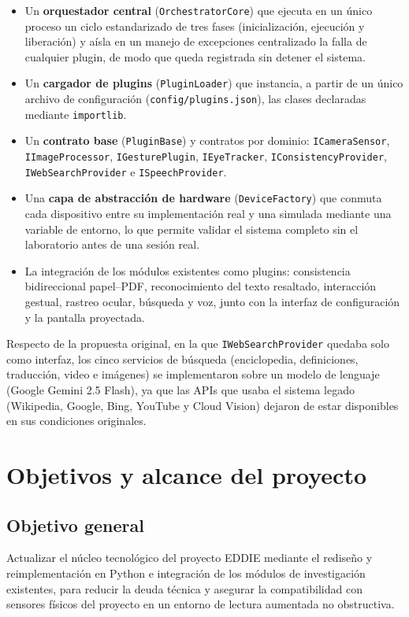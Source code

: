 \begin{itemize}
  \item Un \textbf{orquestador central} (\texttt{OrchestratorCore}) que ejecuta en un único proceso un ciclo estandarizado de tres fases (inicialización, ejecución y liberación) y aísla en un manejo de excepciones centralizado la falla de cualquier plugin, de modo que queda registrada sin detener el sistema.
  \item Un \textbf{cargador de plugins} (\texttt{PluginLoader}) que instancia, a partir de un único archivo de configuración (\texttt{config/plugins.json}), las clases declaradas mediante \texttt{importlib}.
  \item Un \textbf{contrato base} (\texttt{PluginBase}) y contratos por dominio: \texttt{ICameraSensor}, \texttt{IImageProcessor}, \texttt{IGesturePlugin}, \texttt{IEyeTracker}, \texttt{IConsistencyProvider}, \texttt{IWebSearchProvider} e \texttt{ISpeechProvider}.
  \item Una \textbf{capa de abstracción de hardware} (\texttt{DeviceFactory}) que conmuta cada dispositivo entre su implementación real y una simulada mediante una variable de entorno, lo que permite validar el sistema completo sin el laboratorio antes de una sesión real.
  \item La integración de los módulos existentes como plugins: consistencia bidireccional papel--PDF, reconocimiento del texto resaltado, interacción gestual, rastreo ocular, búsqueda y voz, junto con la interfaz de configuración y la pantalla proyectada.
\end{itemize}

Respecto de la propuesta original, en la que \texttt{IWebSearchProvider} quedaba solo como interfaz, los cinco servicios de búsqueda (enciclopedia, definiciones, traducción, video e imágenes) se implementaron sobre un modelo de lenguaje (Google Gemini 2.5 Flash), ya que las APIs que usaba el sistema legado (Wikipedia, Google, Bing, YouTube y Cloud Vision) dejaron de estar disponibles en sus condiciones originales.

\section{Objetivos y alcance del proyecto}

\subsection{Objetivo general}

Actualizar el núcleo tecnológico del proyecto EDDIE mediante el rediseño y reimplementación en Python e integración de los módulos de investigación existentes, para reducir la deuda técnica y asegurar la compatibilidad con sensores físicos del proyecto en un entorno de lectura aumentada no obstructiva.

